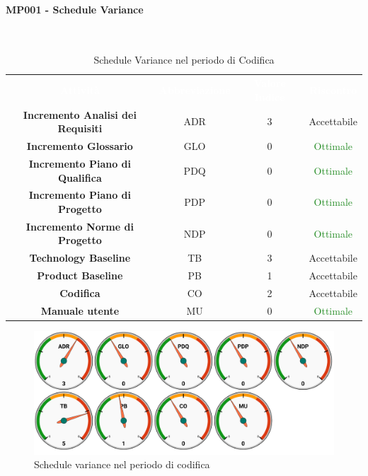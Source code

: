 \paragraph{MP001 - Schedule Variance}\mbox{}\\[0,3cm]

    \begin{table}[H]
        \centering
        \begin{tabular}{cccc}
            \rowcolor{greySWEight}
            \textcolor{white}{\textbf{Attività}} & 
            \textcolor{white}{\textbf{Abbreviazione}} &
            \textcolor{white}{\textbf{Valore Indice}}&
            \textcolor{white}{\textbf{Riscontro}}\\
            \textbf{Incremento Analisi dei Requisiti} & ADR & 3 & \textcolor{YellowOrange}{Accettabile}\\
            \textbf{Incremento Glossario} & GLO & 0 & \textcolor{ForestGreen}{Ottimale} \\
            \textbf{Incremento Piano di Qualifica} & PDQ & 0 & \textcolor{ForestGreen}{Ottimale} \\
            \textbf{Incremento Piano di Progetto} & PDP & 0 & \textcolor{ForestGreen}{Ottimale} \\
            \textbf{Incremento Norme di Progetto} & NDP & 0 & \textcolor{ForestGreen}{Ottimale} \\
            \textbf{Technology Baseline} & TB & 3 & \textcolor{YellowOrange}{Accettabile} \\
            \textbf{Product Baseline} & PB & 1 & \textcolor{YellowOrange}{Accettabile} \\
            \textbf{Codifica} & CO & 2 & \textcolor{YellowOrange}{Accettabile} \\
            \textbf{Manuale utente} & MU & 0 & \textcolor{ForestGreen}{Ottimale} \\

        \end{tabular}
        \caption{Schedule Variance nel periodo di Codifica}
    \end{table}
    \begin{figure}[H]
        \centering
        \includegraphics[width=0.7\linewidth]{sez/App_Esito/Qualifica/graph/SV_RQ.pdf}
        \caption{Schedule variance nel periodo di codifica}
    \end{figure}
